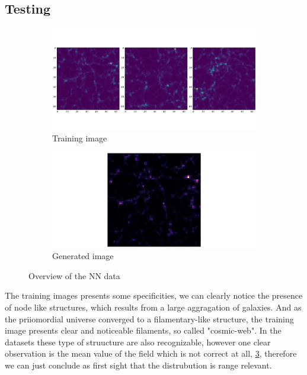 \documentclass[11pt,a4paper]{report}
\begin{document}
\begin{multicols*}{2}
    \section{Testing}
    \vspace*{-1cm}

    \begin{figure}[H]
        \centering

        \begin{subfigure}[h!]{.9\linewidth}
            \includegraphics[width=\textwidth]{figure/training_image.png}
            \caption{Training image}
            \label{fig:training}
        \end{subfigure}
        \vfill
        \begin{subfigure}[h!]{.9\linewidth}
            \includegraphics[width=\textwidth]{figure/generated_image.png}
            \caption{Generated image}
            \label{fig:generated}
        \end{subfigure}
        \caption{Overview of the NN data}
    \end{figure}
    The training images presents some specificities, we can clearly notice the presence of node like structures, which results from a large aggragation of galaxies. And as the priiomordial universe converged to a filamentary-like structure, the training image presents
    clear and noticeable filaments, so called "cosmic-web". In the datasets these type of struucture are also recognizable, however one clear observation is the mean value of the field which is not correct at all, \ref{fig:generated}, therefore we can just conclude as first sight that the distrubution is range relevant.

\end{multicols*}
\end{document}
